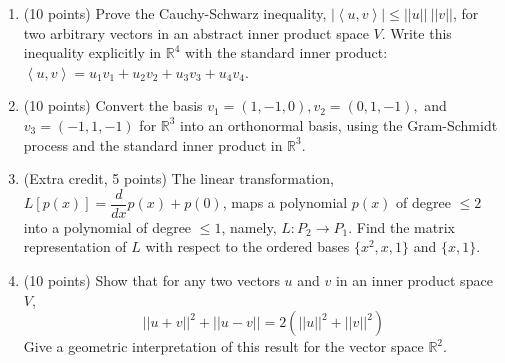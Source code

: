 \documentclass[fleqn]{article}
\begin{document}
\begin{enumerate}
    \item (10 points) Prove the Cauchy-Schwarz inequality, $|\left\langle u, v\right\rangle| \leq ||u|| ~ ||v||$,
    for two arbitrary vectors in an abstract inner product space $V$. Write this inequality explicitly in $\mathbb{R}^4$
    with the standard inner product: $\left\langle u,v\right\rangle =u_1 v_1+u_2 v_2+u_3 v_3+u_4 v_4$.


    \item (10 points) Convert the basis $v_1=(1, -1, 0), v_2=(0, 1, -1),$ and $v_3=(-1, 1, -1)$ for $\mathbb{R}^3$ into
    an orthonormal basis, using the Gram-Schmidt process and the standard inner product in $\mathbb{R}^3$.


    \item (Extra credit, 5 points) The linear transformation, $L \left[p(x)\right]=\dfrac{d}{dx}p(x)+p(0)$, maps 
    a polynomial $p(x)$ of degree $\leq 2$  into a polynomial of degree $\leq 1$, namely, $L: P_2 \rightarrow P_1$.
    Find the matrix representation of $L$ with respect to the ordered bases $\{ x^2, x, 1\}$ and $\{ x, 1\}$.

    \item (10 points) Show that for any two vectors $u$ and $v$ in an inner product space $V$,
    $$||u+v||^2+||u-v||=2\left(||u||^2+||v||^2\right)$$
    Give a geometric interpretation of this result for the vector space $\mathbb{R}^2$.

  \end{enumerate}
\end{document}
